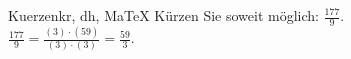 \begin{MAufgabe}{Kuerzen}{kr, dh, MaTeX}
K\"urzen Sie soweit m\"oglich: $\frac{177}{9}$.\\ 
\ifLsg\MLoesung
\quad $\frac{177}{9}=\frac{(3)\cdot(59)}{(3)\cdot(3)}=\frac{59}{3}$.\else\relax\fi
 \end{MAufgabe}